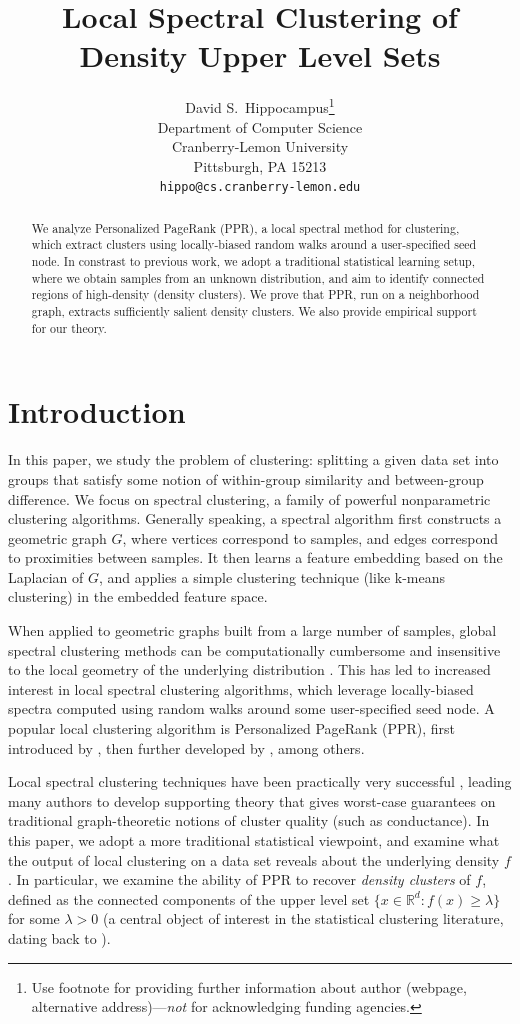 \documentclass{article}
\title{Local Spectral Clustering of Density Upper Level Sets}
\author{%
  David S.~Hippocampus\thanks{Use footnote for providing further information
    about author (webpage, alternative address)---\emph{not} for acknowledging
    funding agencies.} \\
  Department of Computer Science\\
  Cranberry-Lemon University\\
  Pittsburgh, PA 15213 \\
  \texttt{hippo@cs.cranberry-lemon.edu} \\
}
\newcommand{\Reals}{\mathbb{R}}
\newcommand{\Rd}{\Reals^d}
\newcommand{\1}{\mathbf{1}}
\theoremstyle{aldenthm}
\theoremstyle{aldenrmrk}
\begin{document}
\maketitle

\begin{abstract}
We analyze Personalized PageRank (PPR), a local spectral method for clustering,
which extract clusters using locally-biased random walks around a user-specified
seed node.  In constrast to previous work, we adopt a traditional statistical
learning setup, where we obtain samples from an unknown distribution, and aim to
identify connected regions of high-density (density clusters).  We prove that
PPR, run on a neighborhood graph, extracts sufficiently salient density
clusters. We also provide empirical support for our theory.
\end{abstract}

\section{Introduction}
\label{sec: introduction}

In this paper, we study the problem of clustering: splitting a given data set
into groups that satisfy some notion of within-group similarity and
between-group difference.  We focus on spectral clustering, a family of powerful
nonparametric clustering algorithms.  Generally speaking, a spectral algorithm
first constructs a geometric graph $G$, where vertices correspond to samples,
and edges correspond to proximities between samples. It then learns a feature
embedding based on the Laplacian of $G$, and applies a simple clustering
technique (like k-means clustering) in the embedded feature space.

When applied to geometric graphs built from a large number of samples,
global spectral clustering methods can be computationally cumbersome and   
insensitive to the local geometry of the underlying distribution
\citep{leskovec2010,mahoney2012}.  This has led to increased interest in
local spectral clustering algorithms, which leverage locally-biased spectra
computed using random walks around some user-specified seed node.  A popular 
local clustering algorithm is Personalized PageRank (PPR), first introduced by 
\citet{haveliwala2003}, then further developed by
\citep{spielman2011,spielman2014,andersen2006,mahoney2012,zhu2013},
among others.  

Local spectral clustering techniques have been practically very successful
\citep{leskovec2010,andersen2012,gleich2012,mahoney2012,wu2012}, leading 
many authors to develop supporting theory
\citep{spielman2013,andersen2009,gharan2012,zhu2013} that gives worst-case
guarantees on traditional graph-theoretic notions of cluster quality (such as
conductance).  In this paper, we adopt a more traditional statistical viewpoint,
and examine what the output of local clustering on a data set reveals about the
underlying density $f$.  In particular, we examine the ability of PPR to recover
\emph{density clusters} of $f$, defined as the connected components of
the upper level set $\{x \in \Rd : f(x) \geq \lambda\}$ for some $\lambda > 0$
(a central object of interest in the statistical clustering literature, dating
back to \citet{hartigan1981}).   
\end{document}
